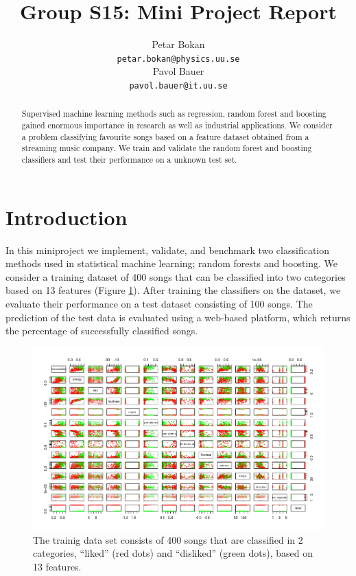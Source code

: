 \documentclass{article}
\title{Group S15: Mini Project Report}
\author{
  Petar Bokan \\
  \texttt{petar.bokan@physics.uu.se} \\
   \And
  Pavol Bauer \\
  \texttt{pavol.bauer@it.uu.se} \\
}
\begin{document}

\maketitle

\begin{abstract}
Supervised machine learning methods such as regression, random forest and boosting gained enormous importance in research as well as industrial applications.
We consider a problem classifying favourite songs based on a feature dataset obtained from a streaming music company.
We train and validate the random forest and boosting classifiers and test their performance on a unknown test set.

\end{abstract}

\section{Introduction}

In this miniproject we implement, validate, and benchmark two classification methods used in statistical machine learning; random forests and boosting.
We consider a training dataset of 400 songs that can be classified into two categories based on 13 features (Figure \ref{fig:pairs}).
After training the classifiers on the dataset, we evaluate their performance on a test dataset consisting of 100 songs.
The prediction of the test data is evaluated using a web-based platform, which returns the percentage of successfully classified songs.

\begin{figure}[htp!]
  \centering
  \includegraphics[height=0.5\textwidth] {figs/song_pairs.png}
  \caption{The trainig data set consists of 400 songs that are classified in 2 categories, ``liked'' (red dots) and ``disliked'' (green dots), based on 13 features.}
  \label{fig:pairs}
\end{figure}
\end{document}
